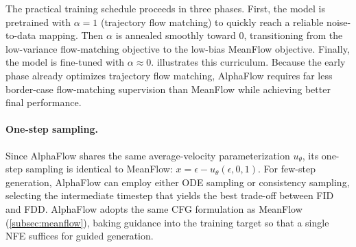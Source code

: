 The practical training schedule proceeds in three phases. First, the model is pretrained with $\alpha = 1$ (trajectory flow matching) to quickly reach a reliable noise-to-data mapping. Then $\alpha$ is annealed smoothly toward 0, transitioning from the low-variance flow-matching objective to the low-bias MeanFlow objective. Finally, the model is fine-tuned with $\alpha \approx 0$.  illustrates this curriculum. Because the early phase already optimizes trajectory flow matching, AlphaFlow requires far less border-case flow-matching supervision than MeanFlow while achieving better final performance.



\paragraph{One-step sampling.} Since AlphaFlow shares the same average-velocity parameterization $u_\theta$, its one-step sampling is identical to MeanFlow: $x = \epsilon - u_\theta(\epsilon, 0, 1)$. For few-step generation, AlphaFlow can employ either ODE sampling or consistency sampling, selecting the intermediate timestep that yields the best trade-off between FID and FDD. AlphaFlow adopts the same CFG formulation as MeanFlow (\cref{subsec:meanflow}), baking guidance into the training target so that a single NFE suffices for guided generation.

